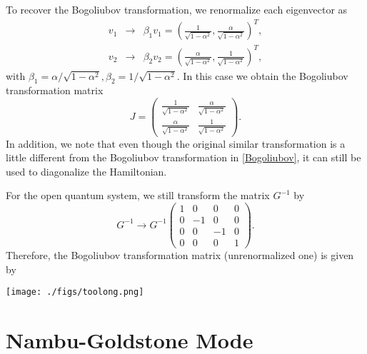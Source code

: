\documentclass[aps,onecolumn,superscriptaddress,notitlepage,longbibliography]{revtex4-1}
\begin{document}
To recover the Bogoliubov transformation, we renormalize each eigenvector as
\begin{eqnarray}
  v_1 & \rightarrow & \beta_1 v_1 = \left( \frac{1}{\sqrt{1 - \alpha^2}},
  \frac{\alpha}{\sqrt{1 - \alpha^2}} \right)^T, \\
  v_2 & \rightarrow & \beta_2 v_2 = \left( \frac{\alpha}{\sqrt{1 - \alpha^2}},
  \frac{1}{\sqrt{1 - \alpha^2}} \right)^T, 
\end{eqnarray}
with $\beta_1 = \alpha / \sqrt{1 - \alpha^2}, \beta_2 = 1 / \sqrt{1 -
\alpha^2}$. In this case we obtain the Bogoliubov transformation matrix
\begin{equation}
  J = \left(\begin{array}{cc}
    \frac{1}{\sqrt{1 - \alpha^2}} & \frac{\alpha}{\sqrt{1 - \alpha^2}}\\
    \frac{\alpha}{\sqrt{1 - \alpha^2}} & \frac{1}{\sqrt{1 - \alpha^2}}
  \end{array}\right) . \label{Bogoliubov}
\end{equation}
In addition, we note that even though the original similar transformation is a
little different from the Bogoliubov transformation in \eqref{Bogoliubov}, it
can still be used to diagonalize the Hamiltonian.

For the open quantum system, we still transform the matrix $G^{- 1}$ by
\begin{equation}
  G^{- 1} \rightarrow G^{- 1} \left(\begin{array}{cccc}
    1 & 0 & 0 & 0\\
    0 & - 1 & 0 & 0\\
    0 & 0 & - 1 & 0\\
    0 & 0 & 0 & 1
  \end{array}\right) .
\end{equation}
Therefore, the Bogoliubov transformation matrix (unrenormalized one) is given
by


\texttt{[image: ./figs/toolong.png]}

\section{Nambu-Goldstone Mode}
\end{document}
